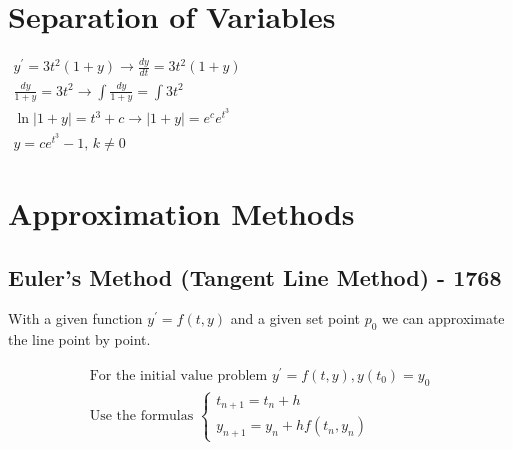 \documentclass[12pt,landscape,twocolumn]{article}
\newcommand{\abs}[1]{\left\lvert#1\right\rvert}           %
\begin{document}
\section{Separation of Variables}
    $
    \begin{aligned}
        y^\prime = 3t^2 (1 + y) \to \frac{dy}{dt} = 3t^2 (1 + y)\\
        \frac{dy}{1+y} = 3t^2 \to \int \frac{dy}{1+y} = \int 3t^2\\
        \ln\abs{1 + y} = t^3 + c \to \abs{1 + y} = e^c e^{t^3}\\
        y = c e^{t^3} - 1, \, k \ne 0
    \end{aligned}
    $

\section{Approximation Methods}
    \subsection{Euler's Method (Tangent Line Method) - 1768}
    With a given function $y^\prime = f(t,y)$ and a given set point $p_0$ we can approximate the line point by point.

    \begin{equation}\label{eq:eulersmethod}
    \begin{aligned}
    \text{For the initial value problem } y^\prime = f(t,y), y(t_0) = y_0\\
    \text{Use the formulas }
    \begin{cases}
    t_{n+1} = t_n + h\\
    y_{n+1} = y_n + h f(t_n, y_n)
    \end{cases}
    \end{aligned}
    \end{equation}
\end{document}
